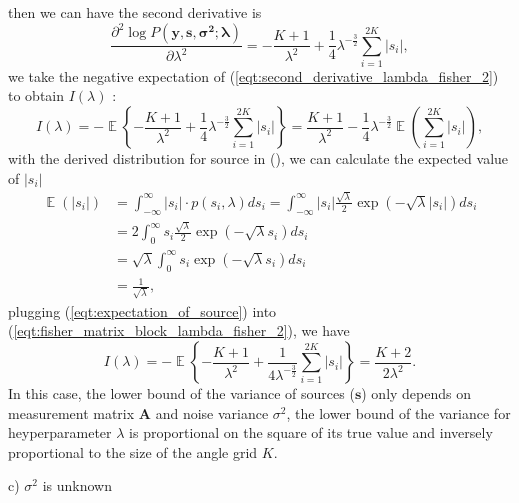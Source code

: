 \documentclass[proposal]{umthesis}          %
\begin{document}
then we can have the second derivative is 
\begin{equation} \label{eqt:second_derivative_lambda_fisher_2}
\frac{\partial^{2} \log P(\mathbf{y,s,\sigma^{2};\lambda})}{\partial \lambda^{2}} = -\frac{K+1}{\lambda^{2}} + \frac{1}{4} \lambda^{-\frac{3}{2}} \sum_{i=1}^{2K}|s_{i}|,
\end{equation}
we take the negative expectation of (\ref{eqt:second_derivative_lambda_fisher_2}) to obtain $I(\lambda)$ :
\begin{equation}  \label{eqt:fisher_matrix_block_lambda_fisher_2}
I(\lambda) = - \mathop{\mathbb{E}} \left \{ -\frac{K+1}{\lambda^{2}} + \frac{1}{4} \lambda^{-\frac{3}{2}} \sum_{i=1}^{2K}|s_{i}| \right \} = \frac{K+1}{\lambda^{2}} - \frac{1}{4} \lambda^{-\frac{3}{2}} \mathop{\mathbb{E}} ( \sum_{i=1}^{2K}|s_{i}|), 
\end{equation} 
with the derived distribution for source in (), we can calculate the expected value of $|s_{i}|$
\begin{align}
\mathop{\mathbb{E}} ( |s_{i}|) & = \int_{-\infty }^{\infty } |s_{i}|\cdot p(s_{i},\lambda) ds_{i} = \int_{-\infty }^{\infty }|s_{i}|\frac{\sqrt{\lambda}}{2}\exp(-\sqrt{\lambda}|s_{i}|)ds_{i} \\
& = 2\int_{0 }^{\infty }s_{i}\frac{\sqrt{\lambda}}{2}\exp(-\sqrt{\lambda}s_{i})ds_{i} \\
& = \sqrt{\lambda}\int_{0 }^{\infty }s_{i}\exp(-\sqrt{\lambda}s_{i})ds_{i}\\
& = \frac{1}{\sqrt{\lambda}}, \label{eqt:expectation_of_source}
\end{align} 
plugging (\ref{eqt:expectation_of_source}) into (\ref{eqt:fisher_matrix_block_lambda_fisher_2}), we have 
\begin{equation}  
I(\lambda) = - \mathop{\mathbb{E}} \left \{ -\frac{K+1}{\lambda^{2}} + \frac{1}{4 \lambda^{-\frac{3}{2}}} \sum_{i=1}^{2K}|s_{i}| \right \} = \frac{K+2}{2\lambda^{2}}. 
\end{equation} 
In this case, the lower bound of the variance of sources ($\mathbf{s}$) only depends on measurement matrix $\mathbf{A}$ and noise variance $\sigma^{2}$, the lower bound of the variance for heyperparameter $\lambda$ is proportional on the square of its true value and inversely proportional to the size of the angle grid $K$.

\noindent
c) $\sigma^{2}$ is unknown
\end{document}
